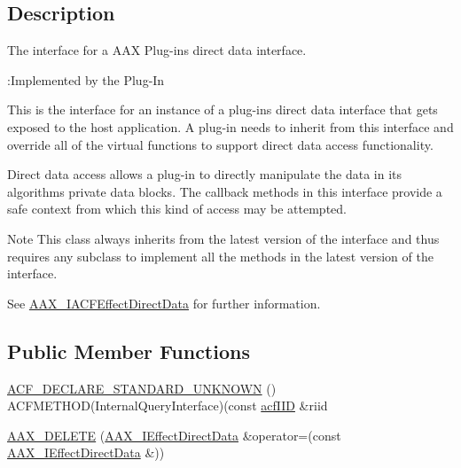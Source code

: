 \subsection{Description}
The interface for a A\+AX Plug-\/in\textquotesingle{}s direct data interface. 

\begin{DoxyRefDesc}{\+:\+Implemented by the Plug-\/\+In}
\item[\mbox{\hyperlink{a00791__aax_plugin_implementation000001}{\+:\+Implemented by the Plug-\/\+In}}]\end{DoxyRefDesc}


This is the interface for an instance of a plug-\/in\textquotesingle{}s direct data interface that gets exposed to the host application. A plug-\/in needs to inherit from this interface and override all of the virtual functions to support direct data access functionality.

Direct data access allows a plug-\/in to directly manipulate the data in its algorithm\textquotesingle{}s private data blocks. The callback methods in this interface provide a safe context from which this kind of access may be attempted.

\begin{DoxyNote}{Note}
This class always inherits from the latest version of the interface and thus requires any subclass to implement all the methods in the latest version of the interface.

See \mbox{\hyperlink{a01661}{A\+A\+X\+\_\+\+I\+A\+C\+F\+Effect\+Direct\+Data}} for further information. 
\end{DoxyNote}
\subsection*{Public Member Functions}
\begin{DoxyCompactItemize}
\item 
\mbox{\hyperlink{a01817_ae303da21b6ac9d50f0c797e49380bb80}{A\+C\+F\+\_\+\+D\+E\+C\+L\+A\+R\+E\+\_\+\+S\+T\+A\+N\+D\+A\+R\+D\+\_\+\+U\+N\+K\+N\+O\+WN}} () A\+C\+F\+M\+E\+T\+H\+OD(Internal\+Query\+Interface)(const \mbox{\hyperlink{a00269_a59df0b41744eee7a066787aaedf97f67}{acf\+I\+ID}} \&riid
\item 
\mbox{\hyperlink{a01817_a05ab4a47b091e970c80e40e047374fe5}{A\+A\+X\+\_\+\+D\+E\+L\+E\+TE}} (\mbox{\hyperlink{a01817}{A\+A\+X\+\_\+\+I\+Effect\+Direct\+Data}} \&operator=(const \mbox{\hyperlink{a01817}{A\+A\+X\+\_\+\+I\+Effect\+Direct\+Data}} \&))
\end{DoxyCompactItemize}
